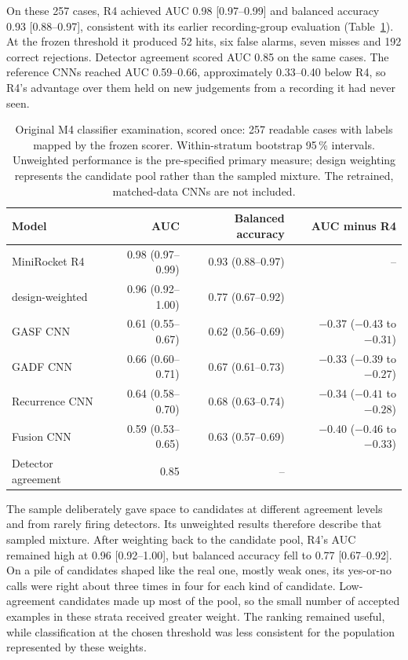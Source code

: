 On these 257 cases, R4 achieved AUC 0.98 [0.97--0.99] and balanced accuracy 0.93 [0.88--0.97], consistent with its earlier recording-group evaluation (Table~\ref{tab:exam}). At the frozen threshold it produced 52 hits, six false alarms, seven misses and 192 correct rejections. Detector agreement scored AUC 0.85 on the same cases. The reference CNNs reached AUC 0.59--0.66, approximately 0.33--0.40 below R4, so R4's advantage over them held on new judgements from a recording it had never seen.

\begin{table}[htbp]
\centering
\caption[{Original M4 classifier examination, scored once.}]{Original M4 classifier examination, scored once: 257 readable cases with labels mapped by the frozen scorer. Within-stratum bootstrap 95\,\% intervals. Unweighted performance is the pre-specified primary measure; design weighting represents the candidate pool rather than the sampled mixture. The retrained, matched-data CNNs are not included.}
\label{tab:exam}
\footnotesize
\begin{tabularx}{\textwidth}{@{}>{\raggedright\arraybackslash}Xrrr@{}}
\toprule
\textbf{Model} & \textbf{AUC} & \textbf{Balanced accuracy} & \textbf{AUC minus R4}\\
\midrule
MiniRocket R4 & 0.98 (0.97--0.99) & 0.93 (0.88--0.97) & --\\
\quad design-weighted & 0.96 (0.92--1.00) & 0.77 (0.67--0.92) & \\
GASF CNN & 0.61 (0.55--0.67) & 0.62 (0.56--0.69) & $-0.37$ ($-0.43$ to $-0.31$)\\
GADF CNN & 0.66 (0.60--0.71) & 0.67 (0.61--0.73) & $-0.33$ ($-0.39$ to $-0.27$)\\
Recurrence CNN & 0.64 (0.58--0.70) & 0.68 (0.63--0.74) & $-0.34$ ($-0.41$ to $-0.28$)\\
Fusion CNN & 0.59 (0.53--0.65) & 0.63 (0.57--0.69) & $-0.40$ ($-0.46$ to $-0.33$)\\
Detector agreement & 0.85 & -- & \\
\bottomrule
\end{tabularx}
\end{table}

The sample deliberately gave space to candidates at different agreement levels and from rarely firing detectors. Its unweighted results therefore describe that sampled mixture. After weighting back to the candidate pool, R4's AUC remained high at 0.96 [0.92--1.00], but balanced accuracy fell to 0.77 [0.67--0.92]. On a pile of candidates shaped like the real one, mostly weak ones, its yes-or-no calls were right about three times in four for each kind of candidate. Low-agreement candidates made up most of the pool, so the small number of accepted examples in these strata received greater weight. The ranking remained useful, while classification at the chosen threshold was less consistent for the population represented by these weights.

